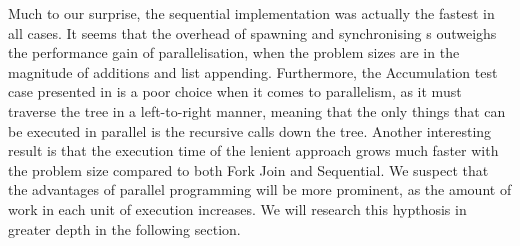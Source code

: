 Much to our surprise, the sequential implementation was actually the fastest in all cases. It seems that the overhead of spawning and synchronising s outweighs the performance gain of parallelisation, when the problem sizes are in the magnitude of additions and list appending. Furthermore, the Accumulation test case presented in \cite{DBLP:journals/cl/Tremblay-parallel} is a poor choice when it comes to parallelism, as it must traverse the tree in a left-to-right manner, meaning that the only things that can be executed in parallel is the recursive calls down the tree. Another interesting result is that the execution time of the lenient approach grows much faster with the problem size compared to both Fork Join and Sequential. We suspect that the advantages of parallel programming will be more prominent, as the amount of work in each unit of execution increases. We will research this hypthosis in greater depth in the following section.
